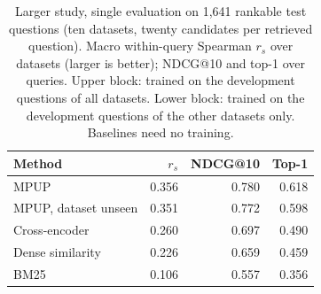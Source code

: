 \documentclass[preprint,12pt,authoryear]{elsarticle}
\begin{document}
\begin{table}[htbp]
    \centering
    \caption{Larger study, single evaluation on 1,641 rankable test questions (ten datasets, twenty candidates per retrieved question). Macro within-query Spearman $r_s$ over datasets (larger is better); NDCG@10 and top-1 over queries. Upper block: trained on the development questions of all datasets. Lower block: trained on the development questions of the other datasets only. Baselines need no training.}
    \label{tab:big}
    \footnotesize
    \begin{tabular}{lrrr}
        \toprule
        \textbf{Method} & \textbf{$r_s$} & \textbf{NDCG@10} & \textbf{Top-1} \\
        \midrule
        MPUP & 0.356 & 0.780 & 0.618 \\
        \midrule
        MPUP, dataset unseen & 0.351 & 0.772 & 0.598 \\
        \midrule
        Cross-encoder & 0.260 & 0.697 & 0.490 \\
        Dense similarity & 0.226 & 0.659 & 0.459 \\
        BM25 & 0.106 & 0.557 & 0.356 \\
        \bottomrule
    \end{tabular}
\end{table}
\end{document}
